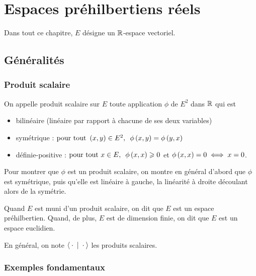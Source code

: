\chapter{Espaces préhilbertiens réels}

\minitoc

Dans tout ce chapitre, \(E\) désigne un \(\mathbb{R}\)-espace vectoriel.

\section{Généralités}

\subsection{Produit scalaire}

\begin{defi}
On appelle produit scalaire sur \(E\) toute application \(\phi\) de \(E^2\) dans \(\mathbb{R}\) qui est

\begin{itemize}
    \item bilinéaire (linéaire par rapport à chacune de ses deux variables) \\
    \item symétrique : \(\quantifs{\tpt\paren{x,y}\in E^2}\phi\paren{x,y}=\phi\paren{y,x}\) \\
    \item définie-positive : \(\quantifs{\tpt x\in E}\phi\paren{x,x}\geq0\) et \(\phi\left(x,x\right)=0\iff x=0\).
\end{itemize}
\end{defi}

\begin{rem}
Pour montrer que \(\phi\) est un produit scalaire, on montre en général d'abord que \(\phi\) est symétrique, puis qu'elle est linéaire à gauche, la linéarité à droite découlant alors de la symétrie.
\end{rem}

\begin{defi}
Quand \(E\) est muni d'un produit scalaire, on dit que \(E\) est un espace préhilbertien. Quand, de plus, \(E\) est de dimension finie, on dit que \(E\) est un espace euclidien.

En général, on note \(\ps{}{}\) les produits scalaires.
\end{defi}

\subsection{Exemples fondamentaux}

